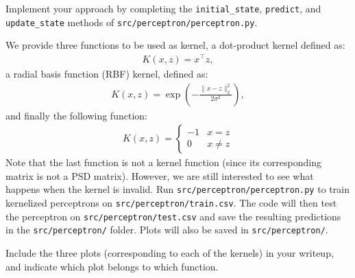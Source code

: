 \item {} Implement your approach by completing the
\texttt{initial\_state}, \texttt{predict}, and \texttt{update\_state} methods
of \texttt{src/perceptron/perceptron.py}.
\label{subsec:perceptron_02}


We provide three functions to be used as kernel, a dot-product kernel defined as:
\begin{align}
	K(x,z) = x^\top z,
\end{align}
a radial basis function (RBF) kernel, defined as:
\begin{align}
K(x,z) = \exp \left (-\frac{\|x-z\|_2^2}{2\sigma^2}\right), 
\end{align}
and finally the following function:
\begin{align}
K(x,z) = \begin{cases}
	 -1 & x=z \\
	 0 & x\neq z
	\end{cases}
\end{align}
\sloppy Note that the last function is not a kernel function (since its corresponding matrix is not a PSD matrix).
However, we are still interested to see what happens when the kernel is invalid.
%
 Run \texttt{src/perceptron/perceptron.py} to train
kernelized perceptrons on \texttt{src/perceptron/train.csv}. The code will then test
the perceptron on \texttt{src/perceptron/test.csv} and save the resulting
predictions in the \texttt{src/perceptron/} folder. Plots will also be saved in
\texttt{src/perceptron/}.


Include the three plots (corresponding to each of the kernels) in your writeup,
and indicate which plot belongs to which function.
